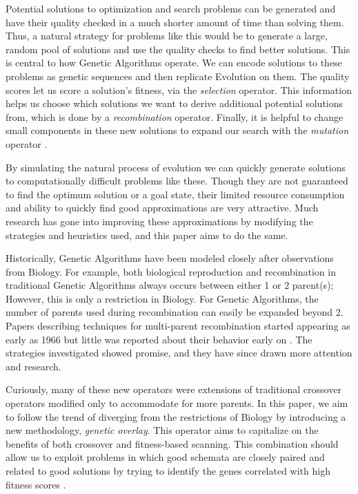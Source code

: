 Potential solutions to optimization and search problems can be generated and have their quality checked in a much shorter amount of time than solving them. Thus, a natural strategy for problems like this would be to generate a large, random pool of solutions and use the quality checks to find better solutions. This is central to how Genetic Algorithms operate. We can encode solutions to these problems as genetic sequences and then replicate Evolution on them. The quality scores let us score a solution's fitness, via the \emph{selection} operator. This information helps us choose which solutions we want to derive additional potential solutions from, which is done by a \emph{recombination} operator. Finally, it is helpful to change small components in these new solutions to expand our search with the \emph{mutation} operator \cite{Deb99}.

By simulating the natural process of evolution we can quickly generate solutions to computationally difficult problems like these. Though they are not guaranteed to find the optimum solution or a goal state, their limited resource consumption and ability to quickly find good approximations are very attractive\cite{Russell10}. Much research has gone into improving these approximations by modifying the strategies and heuristics used, and this paper aims to do the same.

Historically, Genetic Algorithms have been modeled closely after observations from Biology. For example, both biological reproduction and recombination in traditional Genetic Algorithms always occurs between either 1 or 2 parent(s); However, this is only a restriction in Biology\cite{Eiben95}. For Genetic Algorithms, the number of parents used during recombination can easily be expanded beyond 2. Papers describing techniques for multi-parent recombination started appearing as early as 1966 but little was reported about their behavior early on \cite{Eiben03}. The strategies investigated showed promise, and they have since drawn more attention and research\cite{Eiben94}. 

Curiously, many of these new operators were extensions of traditional crossover operators modified only to accommodate for more parents. In this paper, we aim to follow the trend of diverging from the restrictions of Biology by introducing a new methodology, \emph{genetic overlay}. This operator aims to capitalize on the benefits of both crossover and fitness-based scanning. This combination should allow us to exploit problems in which good schemata are closely paired and related to good solutions by trying to identify the genes correlated with high fitness scores \cite{Russell10}. 
